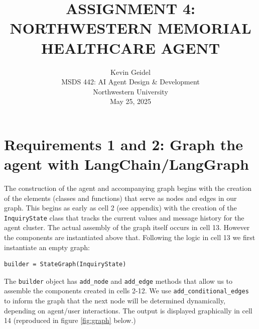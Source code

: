 \documentclass[11pt,letterpaper]{article}
\begin{document}
\selectfont
{}
\doublespacing
\setlength{\droptitle}{1in} 

\title{\large{ASSIGNMENT 4: \\ NORTHWESTERN MEMORIAL HEALTHCARE AGENT \\\vspace{1.2in}}}

\author{
Kevin Geidel \\
MSDS 442: AI Agent Design \& Development \\
Northwestern University \\
May 25, 2025 \\
}

\date{}
\maketitle
\thispagestyle{empty}	
\clearpage
\setcounter{page}{1}


\section*{Requirements 1 and 2: Graph the agent with LangChain/LangGraph}
\tab The construction of the agent and accompanying graph begins with the creation of the elements (classes and functions) that serve as nodes and edges in our graph. This begins as early as cell 2 (see appendix) with the creation of the \texttt{InquiryState} class that tracks the current values and message history for the agent cluster.
The actual assembly of the graph itself occurs in cell 13. However the components are instantiated above that.
Following the logic in cell 13 we first instantiate an empty graph:

\begin{verbatim}
builder = StateGraph(InquiryState)
\end{verbatim}

The \texttt{builder} object has \texttt{add\_node} and \texttt{add\_edge} methods that allow us to assemble the 
components created in cells 2-12. We use \texttt{add\_conditional\_edges} to inform the graph that the next node will be determined dynamically, depending on agent/user interactions. The output is displayed graphically in cell 14 (reproduced in figure \ref{fig:graph} below.)
\end{document}

